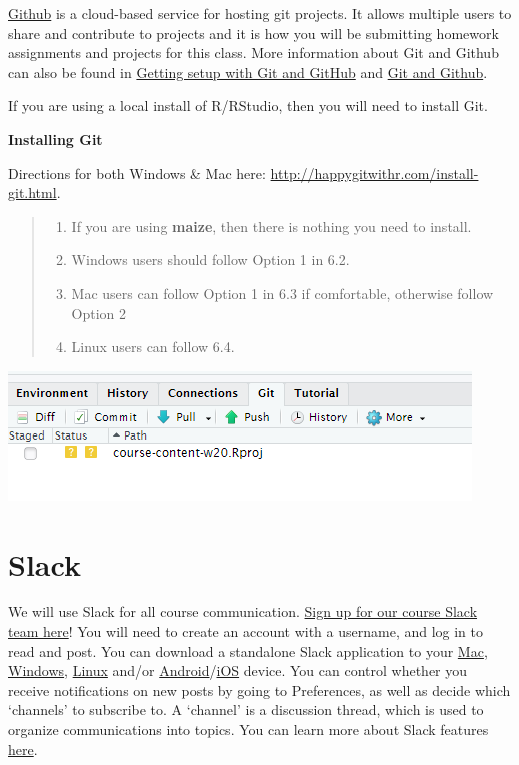 \documentclass[
]{book}
\providecommand{\tightlist}{%
  \setlength{\itemsep}{0pt}\setlength{\parskip}{0pt}}
\begin{document}
\href{https://happygitwithr.com/big-picture.html\#why-github}{Github} is a
cloud-based service for hosting git projects. It allows multiple users
to share and contribute to projects and it is how you will be submitting
homework assignments and projects for this class. More information about Git and
Github can also be found in \href{https://rfortherestofus.com/2021/02/how-to-use-git-github-with-r/}{Getting setup with Git and
GitHub} and \href{https://sahirbhatnagar.com/rpkg/\#gitgithub}{Git and Github}.

If you are using a local install of R/RStudio, then you will need to
install Git.

\textbf{Installing Git}

Directions for both Windows \& Mac here:
\url{http://happygitwithr.com/install-git.html}.

\begin{quote}
\begin{enumerate}
\def\labelenumi{\arabic{enumi}.}
\tightlist
\item
  If you are using \textbf{maize}, then there is nothing you need to install.
\item
  Windows users should follow Option 1 in 6.2.
\item
  Mac users can follow Option 1 in 6.3 if comfortable, otherwise follow Option 2
\item
  Linux users can follow 6.4.
\end{enumerate}
\end{quote}

\includegraphics{img/maize_gittab.png}

\hypertarget{slack}{%
\section{Slack}\label{slack}}

We will use Slack for all course communication. \href{https://join.slack.com/t/slack-eqx6534/shared_invite/zt-1rw47q6fp-pM9VWJLQ0obCGlGVgRvg2Q}{Sign up for our course
Slack team
here}!
You will need to create an account with a username, and log in to read
and post. You can download a
standalone Slack application to your
\href{https://slack.com/downloads/osx}{Mac},
\href{https://slack.com/downloads/windows}{Windows},
\href{https://slack.com/downloads/linux}{Linux} and/or
\href{https://slack.com/downloads/android}{Android}/\href{https://slack.com/downloads/ios}{iOS}
device. You can control whether you receive notifications on new posts
by going to Preferences, as well as decide which `channels' to subscribe
to. A `channel' is a discussion thread, which is used to organize
communications into topics. You can learn more about Slack features
\href{https://slack.com/help/articles/218080037-Getting-started-for-new-Slack-users}{here}.
\end{document}
